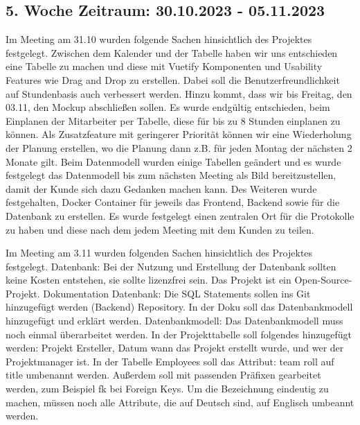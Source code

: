 \documentclass{article}
\begin{document}
    \subsection{5. Woche Zeitraum: 30.10.2023 - 05.11.2023}
        Im Meeting am 31.10 wurden folgende Sachen hinsichtlich des Projektes festgelegt.
    Zwischen dem Kalender und der Tabelle haben wir uns entschieden eine Tabelle zu machen und diese mit Vuetify Komponenten und Usability Features wie Drag and Drop zu erstellen. Dabei soll die Benutzerfreundlichkeit auf Stundenbasis auch verbessert werden. Hinzu kommt, dass wir bis Freitag, den 03.11, den Mockup abschließen sollen.
    Es wurde endgültig entschieden, beim Einplanen der Mitarbeiter per Tabelle, diese für bis zu 8 Stunden einplanen zu können. Als Zusatzfeature mit geringerer Priorität können wir eine Wiederholung der Planung erstellen, wo die Planung dann z.B. für jeden Montag der nächsten 2 Monate gilt.
    Beim Datenmodell wurden einige Tabellen geändert und es wurde festgelegt das Datenmodell bis zum nächsten Meeting als Bild bereitzustellen, damit der Kunde sich dazu Gedanken machen kann. 
    Des Weiteren wurde festgehalten, Docker Container für jeweils das Frontend, Backend sowie für die Datenbank zu erstellen.
    Es wurde festgelegt einen zentralen Ort für die Protokolle zu haben und diese nach dem jedem Meeting mit dem Kunden zu teilen.
    
    Im Meeting am 3.11 wurden folgenden Sachen hinsichtlich des Projektes festgelegt.
    Datenbank:
    Bei der Nutzung und Erstellung der Datenbank sollten keine Kosten entstehen, sie sollte lizenzfrei sein. Das Projekt ist ein Open-Source-Projekt.
    Dokumentation Datenbank: Die SQL Statements sollen ins Git hinzugefügt werden (Backend) Repository. In der Doku soll das Datenbankmodell hinzugefügt und erklärt werden.
    Datenbankmodell:
    Das Datenbankmodell muss noch einmal überarbeitet werden. In der Projekttabelle soll folgendes hinzugefügt werden: Projekt Ersteller, Datum wann das Projekt erstellt wurde, und wer der Projektmanager ist. In der Tabelle Employees soll das Attribut: team roll auf title umbenannt werden. Außerdem soll mit passenden Präfixen gearbeitet werden, zum Beispiel fk  bei Foreign Keys. Um die Bezeichnung eindeutig zu machen, müssen noch alle Attribute, die auf Deutsch sind, auf Englisch umbeannt werden.
    
    
    
\end{document}
